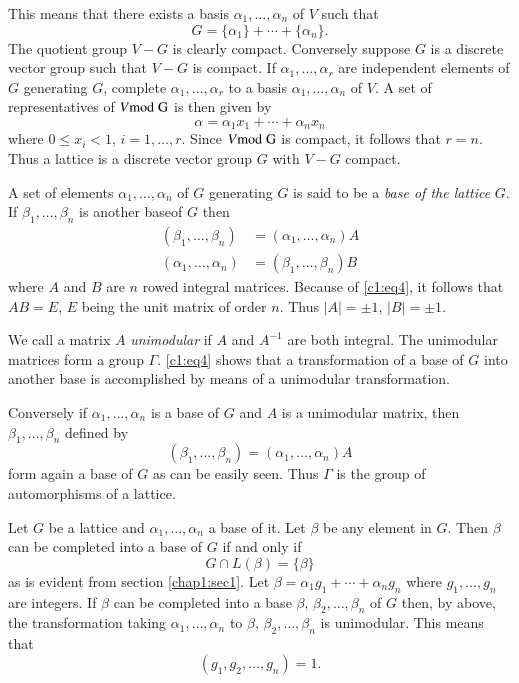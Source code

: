 This means that there exists a basis $\alpha_{1},\ldots,\alpha_{n}$ of
$V$ such that
\begin{equation*}
G=\{\alpha_{1}\}+\cdots+\{\alpha_{n}\}.\tag{3}\label{c1:eq3}
\end{equation*}
The quotient group $V-G$ is clearly compact. Conversely suppose $G$ is
a discrete vector group such that $V-G$ is compact. If
$\alpha_{1},\ldots,\alpha_{r}$ are independent elements of $G$
generating $G$, complete $\alpha_{1},\ldots,\alpha_{r}$ to a basis
$\alpha_{1},\ldots,\alpha_{n}$ of $V$. A set of representatives of $V
\rm{mod} \; G$ is then given by 
$$
\alpha=\alpha_{1}x_{1}+\cdots+\alpha_{n}x_{n}
$$
where $0\leq x_{i}<1$, $i=1,\ldots,r$. Since $V\rm{mod} \; G$ is compact, it
follows that $r=n$. Thus a lattice is a discrete vector group $G$ with
$V-G$ compact.

A set of elements $\alpha_{1},\ldots,\alpha_{n}$ of $G$ generating $G$
is said to be a {\em base of the lattice} $G$. If
$\beta_{1},\ldots,\beta_{n}$ is another base\pageoriginale of $G$ then
\begin{align*}
(\beta_{1},\ldots,\beta_{n}) &= (\alpha_{1},\ldots,\alpha_{n})A\tag{4}\label{c1:eq4}\\
(\alpha_{1},\ldots,\alpha_{n}) &= (\beta_{1},\ldots,\beta_{n})B
\end{align*}
where $A$ and $B$ are $n$ rowed integral matrices. Because of \eqref{c1:eq4}, it
follows that $AB=E$, $E$ being the unit matrix of order $n$. Thus
$|A|=\pm 1$, $|B|=\pm 1$. 

We call a matrix $A$ {\em unimodular} if $A$ and $A^{-1}$ are both
integral. The unimodular matrices form a group $\Gamma$. \eqref{c1:eq4} shows
that a transformation of a base of $G$ into another base is
accomplished by means of a unimodular transformation.

Conversely if $\alpha_{1},\ldots,\alpha_{n}$ is a base of $G$ and $A$
is a unimodular matrix, then $\beta_{1},\ldots,\beta_{n}$ defined by
$$
(\beta_{1},\ldots,\beta_{n})=(\alpha_{1},\ldots,\alpha_{n})A
$$
form again a base of $G$ as can be easily seen. Thus $\Gamma$ is the
group of automorphisms of a lattice.

Let $G$ be a lattice and $\alpha_{1},\ldots,\alpha_{n}$ a base of
it. Let $\beta$ be any element in $G$. Then $\beta$ can be completed
into a base of $G$ if and only if
$$
G\cap L(\beta)=\{\beta\}
$$
as is evident from section \ref{chap1:sec1}. Let
$\beta=\alpha_{1}g_{1}+\cdots+\alpha_{n}g_{n}$ where
$g_{1},\ldots,g_{n}$ are integers. If $\beta$ can be completed into a
base $\beta$, $\beta_{2},\ldots,\beta_{n}$ of $G$ then, by above, the
transformation taking $\alpha_{1},\ldots,\alpha_{n}$ to $\beta$,
$\beta_{2},\ldots,\beta_{n}$ is unimodular. This means that 
$$
(g_{1},g_{2},\ldots,g_{n})=1.
$$

